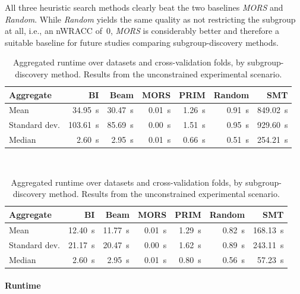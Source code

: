 \documentclass{article}
\theoremstyle{definition}
\begin{document}
All three heuristic search methods clearly beat the two baselines \emph{MORS} and \emph{Random}.
While \emph{Random} yields the same quality as not restricting the subgroup at all, i.e., an nWRACC of~0, \emph{MORS} is considerably better and therefore a suitable baseline for future studies comparing subgroup-discovery methods.

\begin{table}[t]
	\centering
	\begin{subtable}{\textwidth}
		\centering
		\begin{tabular}{lrrrrrr}
			\toprule
			Aggregate & BI & Beam & MORS & PRIM & Random & SMT \\
			\midrule
			Mean & 34.95~s & 30.47~s & 0.01~s & 1.26~s & 0.91~s & 849.02~s \\
			Standard dev. & 103.61~s & 85.69~s & 0.00~s & 1.51~s & 0.95~s & 929.60~s \\
			Median & 2.60~s & 2.95~s & 0.01~s & 0.66~s & 0.51~s & 254.21~s \\
			\bottomrule
		\end{tabular}
		\caption{
			All datasets.
		}
		\label{tab:csd:unconstrained-runtime-all-datasets}
	\end{subtable}
	\\ \vspace{\baselineskip}
	\begin{subtable}{\textwidth}
		\centering
		\begin{tabular}{lrrrrrr}
			\toprule
			Aggregate & BI & Beam & MORS & PRIM & Random & SMT \\
			\midrule
			Mean & 12.40~s & 11.77~s & 0.01~s & 1.29~s & 0.82~s & 168.13~s \\
			Standard dev. & 21.17~s & 20.47~s & 0.00~s & 1.62~s & 0.89~s & 243.11~s \\
			Median & 2.60~s & 2.95~s & 0.01~s & 0.80~s & 0.56~s & 57.23~s \\
			\bottomrule
		\end{tabular}
		\caption{
			Datasets without \emph{SMT} timeouts.
		}
		\label{tab:csd:unconstrained-runtime-no-timeout-datasets}
	\end{subtable}
	\caption{
		Aggregated runtime over datasets and cross-validation folds, by subgroup-discovery method.
		Results from the unconstrained experimental scenario.
	}
	\label{tab:csd:unconstrained-runtime}
\end{table}

\paragraph{Runtime}
\end{document}
